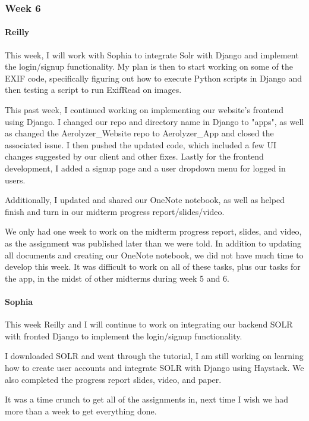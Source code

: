\documentclass[onecolumn, draftclsnofoot,10pt, compsoc]{IEEEtran}
\begin{document}
\begin{flushleft}
\subsubsection{Week 6}
\paragraph{Reilly}
 
This week, I will work with Sophia to integrate Solr with Django and implement the login/signup functionality. My plan is then to start working on some of the EXIF code, specifically figuring out how to execute Python scripts in Django and then testing a script to run ExifRead on images.
 
 
This past week, I continued working on implementing our website's frontend using Django. I changed our repo and directory name in Django to "apps", as well as changed the Aerolyzer\_Website repo to Aerolyzer\_App and closed the associated issue. I then pushed the updated code, which included a few UI changes suggested by our client and other fixes. Lastly for the frontend development, I added a signup page and a user dropdown menu for logged in users.
 
Additionally, I updated and shared our OneNote notebook, as well as helped finish and turn in our midterm progress report/slides/video.
 
 
We only had one week to work on the midterm progress report, slides, and video, as the assignment was published later than we were told. In addition to updating all documents and creating our OneNote notebook, we did not have much time to develop this week. It was difficult to work on all of these tasks, plus our tasks for the app, in the midst of other midterms during week 5 and 6.
 
\paragraph{Sophia}
 
This week Reilly and I will continue to work on integrating our backend SOLR with fronted Django to implement the login/signup functionality.
 
 
I downloaded SOLR and went through the tutorial, I am still working on learning how to create user accounts and integrate SOLR with Django using Haystack. We also completed the progress report slides, video, and paper.
 
 
It was a time crunch to get all of the assignments in, next time I wish we had more than a week to get everything done.
 

\end{flushleft}
\end{document}
